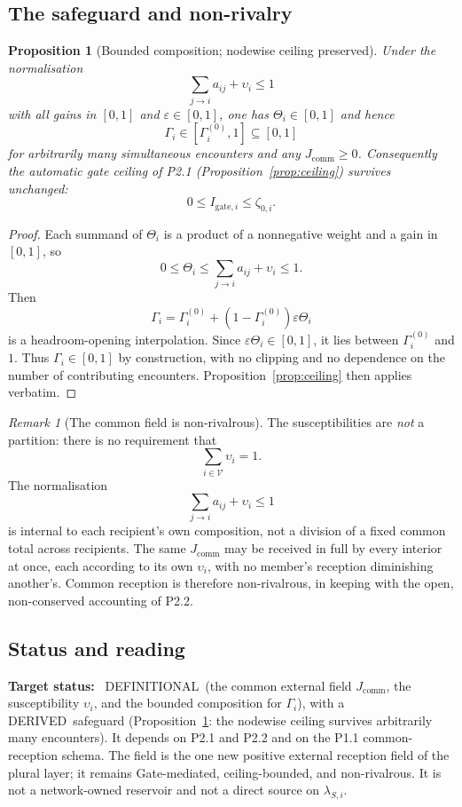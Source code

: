 \documentclass[11pt,a4paper]{article}
\newcommand{\stDerived}{\textcolor{cDer}{\textsf{\small DERIVED}}}
\newcommand{\stDef}{\textcolor{cDef}{\textsf{\small DEFINITIONAL}}}
\theoremstyle{definition}
\theoremstyle{plain}
\newtheorem{proposition}[definition]{Proposition}
\theoremstyle{remark}
\newtheorem{remark}[definition]{Remark}
\begin{document}
\subsection{The safeguard and non-rivalry}

\begin{proposition}[Bounded composition; nodewise ceiling preserved]\label{prop:safeguard}
Under the normalisation
\[
\sum_{j\to i}a_{ij}+\upsilon_i\le1
\]
with all gains in \([0,1]\) and \(\varepsilon\in[0,1]\), one has
\(\Theta_i\in[0,1]\) and hence
\[
\Gamma_i\in[\Gamma_i^{(0)},1]\subseteq[0,1]
\]
for arbitrarily many simultaneous encounters and any
\(J_{\mathrm{comm}}\ge0\). Consequently the automatic gate ceiling of P2.1
(Proposition~\ref{prop:ceiling}) survives unchanged:
\[
0\le I_{\mathrm{gate},i}\le\zeta_{0,i}.
\]
\end{proposition}

\begin{proof}
Each summand of \(\Theta_i\) is a product of a nonnegative weight and a gain in
\([0,1]\), so
\[
0\le\Theta_i\le\sum_{j\to i}a_{ij}+\upsilon_i\le1.
\]
Then
\[
\Gamma_i
=
\Gamma_i^{(0)}+(1-\Gamma_i^{(0)})\varepsilon\Theta_i
\]
is a headroom-opening interpolation. Since \(\varepsilon\Theta_i\in[0,1]\), it lies
between \(\Gamma_i^{(0)}\) and \(1\). Thus \(\Gamma_i\in[0,1]\) by construction,
with no clipping and no dependence on the number of contributing encounters.
Proposition~\ref{prop:ceiling} then applies verbatim. \qedhere
\end{proof}

\begin{remark}[The common field is non-rivalrous]\label{rem:nonrival}
The susceptibilities are \emph{not} a partition: there is no requirement that
\[
\sum_{i\in\mathcal V}\upsilon_i=1.
\]
The normalisation
\[
\sum_{j\to i}a_{ij}+\upsilon_i\le1
\]
is internal to each recipient's own composition, not a division of a fixed common
total across recipients. The same \(J_{\mathrm{comm}}\) may be received in full by
every interior at once, each according to its own \(\upsilon_i\), with no member's
reception diminishing another's. Common reception is therefore non-rivalrous, in
keeping with the open, non-conserved accounting of P2.2.
\end{remark}

\subsection{Status and reading}

\textbf{Target status:}~
\stDef\ (the common external field \(J_{\mathrm{comm}}\), the susceptibility \(\upsilon_i\), and
the bounded composition for \(\Gamma_i\)), with a \stDerived\ safeguard
(Proposition~\ref{prop:safeguard}: the nodewise ceiling survives arbitrarily many
encounters). It depends on P2.1 and P2.2 and on the P1.1 common-reception schema. The field
is the one new positive external reception field of the plural layer; it
remains Gate-mediated, ceiling-bounded, and non-rivalrous. It is not a
network-owned reservoir and not a direct source on \(\lambda_{S,i}\).
\end{document}
